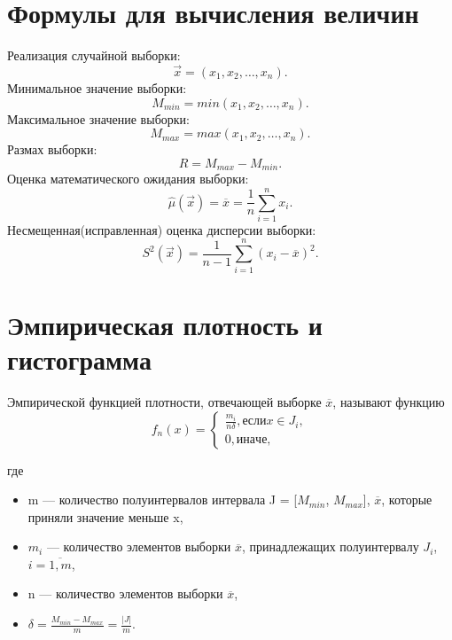 \documentclass[a4paper, 14pt, unknownkeysallowed]{extreport}
\begin{document}
\section{Формулы для вычисления величин}
Реализация случайной выборки:
\begin{equation}
	\label{x}
	\overrightarrow{x} = (x_1, x_2,\dots,x_n).
\end{equation}
Минимальное значение выборки:
\begin{equation}
	\label{min}
	M_{min} = min(x_1, x_2,\dots,x_n).
\end{equation}
Максимальное значение выборки:
\begin{equation}
	\label{max}
	M_{max} = max(x_1, x_2,\dots,x_n).
\end{equation}
Размах выборки:
\begin{equation}
	\label{r}
	R = M_{max} - M_{min}.
\end{equation}
Оценка математического ожидания выборки:
\begin{equation}
	\label{mu}
	\hat{\mu}(\overrightarrow{x}) = \overline{x} = \frac{1}{n}\sum_{i=1}^{n}x_i.
\end{equation}
Несмещенная(исправленная) оценка дисперсии выборки:
\begin{equation}
	\label{s2}
	S^2(\overrightarrow{x}) = \frac{1}{n-1}\sum_{i=1}^{n}{(x_i - \overline{x})^2}.
\end{equation}

\section{Эмпирическая плотность и гистограмма}
\begin{definition}
	Эмпирической функцией плотности, отвечающей выборке  $\overline{x}$, называют функцию
	\begin{equation}
		f_{n} (x) = \begin{cases}
			\frac{m_i}{n\delta}, если x\in J_i,\\
			0, иначе,
		\end{cases}
	\end{equation}
\end{definition}
	где 
	\begin{itemize}
		\item m --- количество полуинтервалов интервала J = [$M_{min}$, $M_{max}$], $\overline{x}$, которые приняли значение меньше x,
		\item $m_i$ --- количество элементов выборки  $\overline{x}$, принадлежащих полуинтервалу $J_i$, $i=\overline{1,m}$,
		\item n --- количество элементов выборки  $\overline{x}$,
		\item $\delta = \frac{M_{min} - M_{max}}{m} = \frac{|J|}{m}$.
	\end{itemize}
\end{document}

